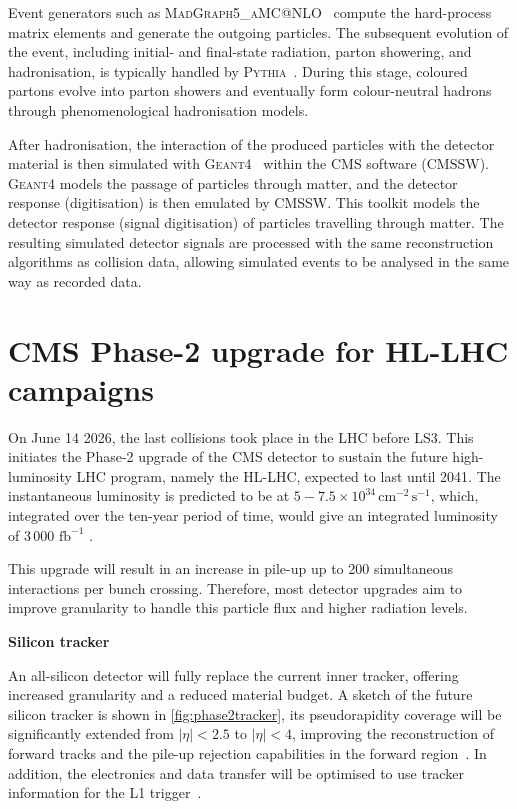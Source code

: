 Event generators such as \textsc{MadGraph5\_aMC@NLO}~\cite{Alwall:2014hca} compute the hard-process matrix elements and generate the outgoing particles. The subsequent evolution of the event, including initial- and final-state radiation, parton showering, and hadronisation, is typically handled by \textsc{Pythia}~\cite{Sjostrand:2014zea}. During this stage, coloured partons evolve into parton showers and eventually form colour-neutral hadrons through phenomenological hadronisation models.

After hadronisation, the interaction of the produced particles with the detector material is then simulated with \textsc{Geant4}~\cite{Agostinelli:2003hh} within the CMS software (CMSSW). \textsc{Geant4} models the passage of particles through matter, and the detector response (digitisation) is then emulated by CMSSW. This toolkit models the detector response (signal digitisation) of particles travelling through matter. The resulting simulated detector signals are processed with the same reconstruction algorithms as collision data, allowing simulated events to be analysed in the same way as recorded data.


\section[CMS Phase-2 upgrade for HL-LHC campaigns]{CMS Phase-2 upgrade for HL-LHC \\ campaigns}
\label{sec:HLLHC}

On June 14 2026, the last collisions took place in the LHC before LS3. This initiates the Phase-2 upgrade of the CMS detector to sustain the future high-luminosity LHC program, namely the HL-LHC, expected to last until 2041. The instantaneous luminosity is predicted to be at $5{-}7.5 \times 10^{34} \, \textrm{cm}^{-2}\,\textrm{s}^{-1}$, which, integrated over the ten-year period of time, would give an integrated luminosity of 3\,000 $\textrm{fb}^{-1}$ \cite{HLLHCplans}. 

This upgrade will result in an increase in pile-up up to 200 simultaneous interactions per bunch crossing. Therefore, most detector upgrades aim to improve granularity to handle this particle flux and higher radiation levels.

\vspace{0.5 cm}
\noindent \textbf{Silicon tracker}
\vspace{0.5 cm}

An all-silicon detector will fully replace the current inner tracker, offering increased granularity and a reduced material budget. A sketch of the future silicon tracker is shown in \cref{fig:phase2tracker}, its pseudorapidity coverage will be significantly extended from $|\eta| < 2.5$ to $|\eta| < 4$, improving the reconstruction of forward tracks and the pile-up rejection capabilities in the forward region~\cite{Phase2Tracker}. In addition, the electronics and data transfer will be optimised to use tracker information for the L1 trigger~\cite{Phase2L1trigger}.


